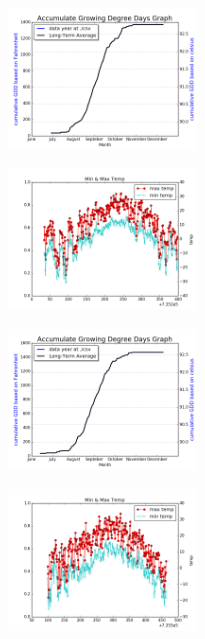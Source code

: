 \documentclass[DIV=calc, paper=a4, fontsize=11pt, twocolumn]{scrartcl}
\begin{document}
\begin{figure}[h!]
	\centering
	\includegraphics[width=50mm]{../output/50430_2014_gdd.png}

	\label{fig:method13}
\end{figure}
\begin{figure}[h!]
	\centering
	\includegraphics[width=50mm]{../output/50430_2014_minmax.png}

	\label{fig:method14}
\end{figure}
\begin{figure}[h!]
	\centering
	\includegraphics[width=50mm]{../output/50430_2015_gdd.png}

	\label{fig:method15}
\end{figure}


\begin{figure}[h!]
	\centering
	\includegraphics[width=50mm]{../output/50430_2015_minmax.png}
	\label{fig:method16}
\end{figure}
\end{document}
